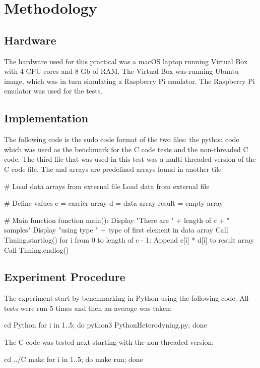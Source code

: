 \section{Methodology}

\subsection{Hardware}
The hardware used for this practical was a macOS laptop running Virtual Box with 4 CPU cores and 8 Gb of RAM. The Virtual Box was running Ubuntu image, which was in turn simulating a Raspberry Pi emulator. The Raspberry Pi emulator was used for the tests.

\subsection{Implementation}
The following code is the sudo code format of the two files: the python code which was used as the benchmark for the C code tests and the non-threaded C code.
The third file that was used in this test was a multi-threaded version of the C code file.
The  and  arrays are predefined arrays found in another tile

\begin{Cpp}
 # Load data arrays from external file
 Load data from external file

 # Define values
 c = carrier array
 d = data array
 result = empty array

 # Main function
 function main():
  Display "There are " + length of c + " samples"
  Display "using type " + type of first element in data array
  Call Timing.startlog()
  for i from 0 to length of c - 1:
  Append c[i] * d[i] to result array
  Call Timing.endlog()
\end{Cpp}

\subsection{Experiment Procedure}
The experiment start by benchmarking in Python using the following code.
All tests were run 5 times and then an average was taken:

\begin{Cpp}
 cd Python
 for i in {1..5}; do python3 PythonHeterodyning.py; done
\end{Cpp}

The C code was tested next starting with the non-threaded version:
\begin{Cpp}
 cd ../C
 make
 for i in {1..5}; do make run; done
\end{Cpp}

